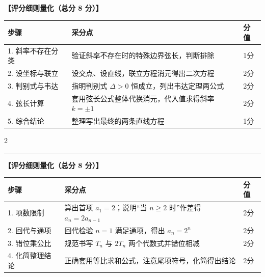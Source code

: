 \documentclass[11pt,a4paper]{ctexart}
\begin{document}
\newpage

{\small \qGeneralExampleFiveStem}

\begingroup\small
\noindent\textbf{【评分细则量化（总分 8 分）】}\par\nopagebreak\addvspace{0.3em}
\begin{tabularx}{\textwidth}{|p{2.5cm}|X|p{1.5cm}|}
\hline
步骤 & 采分点 & 分值 \\ \hline
1. 斜率不存在分类 & 验证斜率不存在时的特殊边界弦长，判断排除 & 1分 \\ \hline
2. 设坐标与联立 & 设交点、设直线，联立方程消元得出二次方程 & 2分 \\ \hline
3. 判别式与韦达 & 指明判别式 \(\Delta > 0\) 恒成立，列出韦达定理两公式 & 2分 \\ \hline
4. 弦长计算 & 套用弦长公式整体代换消元，代入值求得斜率 \(k = \pm 1\) & 2分 \\ \hline
5. 综合结论 & 整理写出最终的两条直线方程 & 1分 \\ \hline
\end{tabularx}
\endgroup

\begin{paracol}{2}

\switchcolumn
{}
\end{paracol}

\addvspace{1.0em}
\hrule
\addvspace{1.0em}

{\small \qGeneralExampleSixStem}

\begingroup\small
\noindent\textbf{【评分细则量化（总分 8 分）】}\par\nopagebreak\addvspace{0.3em}
\begin{tabularx}{\textwidth}{|p{2.5cm}|X|p{1.5cm}|}
\hline
步骤 & 采分点 & 分值 \\ \hline
1. 项数限制 & 算出首项 \(a_1 = 2\)；说明“当 \(n \ge 2\) 时”作差得 \(a_n = 2a_{n-1}\) & 2分 \\ \hline
2. 回代与通项 & 回代检验 \(n=1\) 满足通项，得出 \(a_n = 2^n\) & 2分 \\ \hline
3. 错位乘公比 & 规范书写 \(T_n\) 与 \(2T_n\) 两个代数式并错位相减 & 2分 \\ \hline
4. 化简整理结论 & 正确套用等比求和公式，注意尾项符号，化简得出结论 & 2分 \\ \hline
\end{tabularx}
\endgroup
\end{document}

